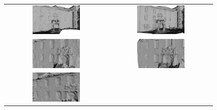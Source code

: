\begin{figure}[tp]
\centering
\setlength{\tabcolsep}{1px}
\begin{tabular}{cc}
\includegraphics[width=0.48\textwidth]{./img/ch-incr-dens/castle05}&
\includegraphics[width=0.48\textwidth]{./img/ch-incr-dens/castle06}\\
\includegraphics[width=0.48\textwidth]{./img/ch-incr-dens/castle07}&
\includegraphics[width=0.48\textwidth]{./img/ch-incr-dens/castle08}\\
\includegraphics[width=0.48\textwidth]{./img/ch-incr-dens/castle12}&

\end{tabular}
\end{figure}
